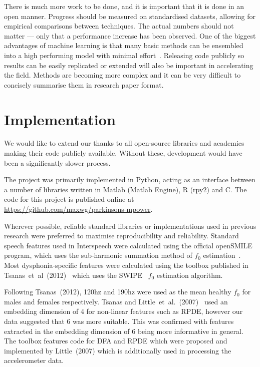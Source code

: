 \documentclass[12pt, twoside]{book}
\begin{document}

There is much more work to be done, and it is important that it is done in an open manner. Progress should be measured on standardised datasets, allowing for empirical comparisons between techniques. The actual numbers should not matter --- only that a performance increase has been observed. One of the biggest advantages of machine learning is that many basic methods can be ensembled into a high performing model with minimal effort~\cite{netflixprizebellkor}. Releasing code publicly so results can be easily replicated or extended will also be important in accelerating the field. Methods are becoming more complex and it can be very difficult to concisely summarise them in research paper format.






\section{Implementation}
\label{implementation}
We would like to extend our thanks to all open-source libraries and academics making their code publicly available. Without these, development would have been a significantly slower process. 

The project was primarily implemented in Python, acting as an interface between a number of libraries written in Matlab (Matlab Engine), R (rpy2) and C. The code for this project is published online at \url{https://github.com/maxwg/parkinsons-mpower}.

Wherever possible, reliable standard libraries or implementations used in previous research were preferred to maximise reproducibility and reliability. Standard speech features used in Interspeech were calculated using the official openSMILE~\cite{opensmile} program, which uses the sub-harmonic summation method of $f_0$ estimation~\cite{shs}. Most dysphonia-specific features were calculated using the toolbox published in Tsanas~et~al~(2012)~\cite{spoverview} which uses the SWIPE~\cite{camacho2007swipe,f0estimation} $f_0$ estimation algorithm. 

Following Tsanas~(2012), 120hz and 190hz were used as the mean healthy $f_0$ for males and females respectively. Tsanas and Little~et~al.~(2007)~\cite{splittlenonlinear2007} used an embedding dimension of 4 for non-linear features such as RPDE, however our data suggested that 6 was more suitable. This was confirmed with features extracted in the embedding dimension of 6 being more informative in general. The toolbox features code for DFA and RPDE which were proposed and implemented by Little~(2007) which is additionally used in processing the accelerometer data.
\end{document}
